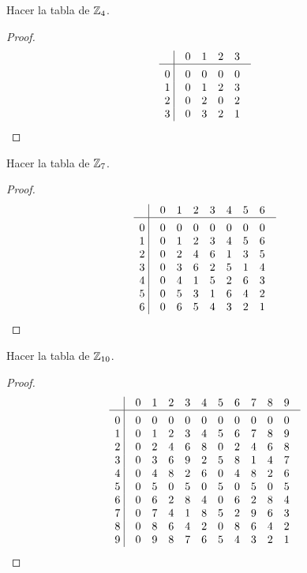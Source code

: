 \documentclass[main.tex]{subfiles}
\begin{document}
\begin{example}
    Hacer la tabla de $\mathbb Z_4$.
\end{example}

\begin{proof}
    $$\vbox{\tabskip0.5em\offinterlineskip
    \halign{\strut$#$\hfil\ \tabskip1em\vrule&&$#$\hfil\cr
    ~   & 0   & 1   &2 & 3 \cr
    \noalign{\hrule}\vrule height 12pt width 0pt
    0   & 0   & 0   & 0   & 0 \cr
    1   & 0   & 1   & 2   & 3 \cr
    2   & 0   & 2   & 0   & 2 \cr
    3   & 0   & 3   & 2   & 1 \cr
}}$$
\end{proof}

\begin{example}
    Hacer la tabla de $\mathbb Z_7$.
\end{example}

\begin{proof}
    $$\vbox{\tabskip0.5em\offinterlineskip
    \halign{\strut$#$\hfil\ \tabskip1em\vrule&&$#$\hfil\cr
    ~   & 0   & 1   &2 & 3   & 4 & 5 &6\cr
    \noalign{\hrule}\vrule height 12pt width 0pt
    0   & 0   & 0   & 0   & 0   & 0    &0    &0\cr
    1   & 0   & 1   & 2   & 3   & 4    &5    &6\cr
    2   & 0   & 2   & 4   & 6   & 1    &3    &5\cr
    3   & 0   & 3   & 6   & 2   & 5    &1    &4\cr
    4   & 0   & 4   & 1   & 5   & 2    &6    &3\cr
    5   & 0   & 5   & 3   & 1   & 6    &4    &2\cr
    6   & 0   & 6   & 5   & 4   & 3    &2    &1\cr
}}$$
\end{proof}

\begin{example}
    Hacer la tabla de $\mathbb Z_{10}$.
\end{example}

\begin{proof}
    $$\vbox{\tabskip0.5em\offinterlineskip
    \halign{\strut$#$\hfil\ \tabskip1em\vrule&&$#$\hfil\cr
    ~   & 0   & 1   &2 & 3   & 4 & 5 &6 &7 &8 &9\cr
    \noalign{\hrule}\vrule height 12pt width 0pt
    0   & 0   & 0   & 0   & 0   & 0    &0    &0 &0 &0 &0\cr
    1   & 0   & 1   & 2   & 3   & 4    &5    &6 &7 &8 &9\cr
    2   & 0   & 2   & 4   & 6   & 8    &0    &2 &4 &6 &8\cr
    3   & 0   & 3   & 6   & 9   & 2    &5    &8 &1 &4 &7\cr
    4   & 0   & 4   & 8   & 2   & 6    &0    &4 &8 &2 &6\cr
    5   & 0   & 5   & 0   & 5   & 0    &5    &0 &5 &0 &5\cr
    6   & 0   & 6   & 2   & 8   & 4    &0    &6 &2 &8 &4\cr
    7   & 0   & 7   & 4   & 1   & 8    &5    &2 &9 &6 &3\cr
    8   & 0   & 8   & 6   & 4   & 2    &0    &8 &6 &4 &2\cr
    9   & 0   & 9   & 8   & 7   & 6    &5    &4 &3 &2 &1\cr
}}$$
\end{proof}
\end{document}
